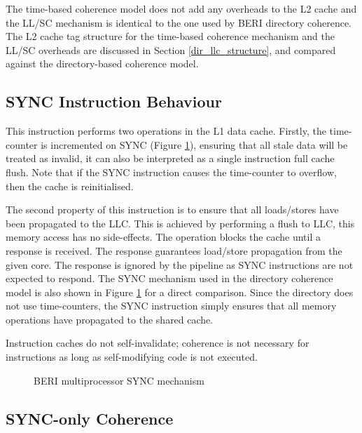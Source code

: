 		The time-based coherence model does not add any overheads to the L2 cache and the LL/SC mechanism is identical to the one used by BERI directory coherence. The L2 cache tag structure for the time-based coherence mechanism and the LL/SC overheads are discussed in Section \ref{dir_llc_structure}, and compared against the directory-based coherence model.
		
	\subsection{SYNC Instruction Behaviour}
		\label{sync_behaviour}
		This instruction performs two operations in the L1 data cache. 
		Firstly, the time-counter is incremented on SYNC (Figure \ref{beri_sync}), ensuring that all stale data will be treated as invalid, it can also be interpreted as a single instruction full cache flush. 
		Note that if the SYNC instruction causes the time-counter to overflow, then the cache is reinitialised. 
		
		The second property of this instruction is to ensure that all loads/stores have been propagated to the LLC. 
		This is achieved by performing a flush to LLC, this memory access has no side-effects. The operation blocks the cache until a response is received. The response guarantees load/store propagation from the given core. The response is ignored by the pipeline as SYNC instructions are not expected to respond. 
		The SYNC mechanism used in the directory coherence model is also shown in Figure \ref{beri_sync} for a direct comparison. Since the directory does not use time-counters, the SYNC instruction simply ensures that all memory operations have propagated to the shared cache.
		
		Instruction caches do not self-invalidate; coherence is not necessary for instructions as long as self-modifying code is not executed.
		
		\begin{figure}[t]
			\centering 
				\caption{BERI multiprocessor SYNC mechanism} 
				\label{beri_sync}
		\end{figure}


\subsection{SYNC-only Coherence}
	\label{sync_only_coherence}
	
	
